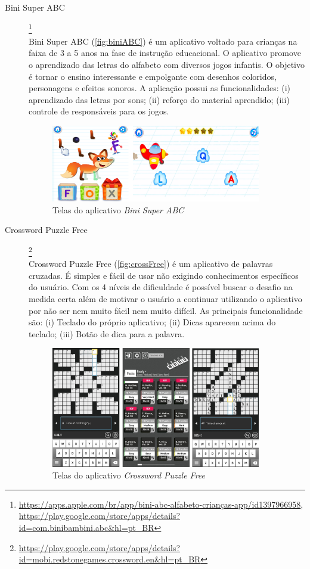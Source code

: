 \begin{description}
\item[Bini Super ABC]\footnote{\url{https://apps.apple.com/br/app/bini-abc-alfabeto-crianças-app/id1397966958}, \url{https://play.google.com/store/apps/details?id=com.binibambini.abc&hl=pt_BR}} \hfill \\
Bini Super ABC (\autoref{fig:biniABC}) é um aplicativo voltado para crianças na faixa de 3 a 5 anos na fase de instrução educacional. O aplicativo promove o aprendizado das letras do alfabeto com diversos jogos infantis. O objetivo é tornar o ensino interessante e empolgante com desenhos coloridos, personagens e efeitos sonoros. A aplicação possui as funcionalidades: (i) aprendizado das letras por sons; (ii) reforço do material aprendido; (iii) controle de responsáveis para os jogos.

\begin{figure}[H]
\centering
    \includegraphics[width=0.9\textwidth]{Figuras/biniabc.png}
    \caption{Telas do aplicativo \textit{Bini Super ABC}}
    \label{fig:biniABC}
\end{figure}

\item[Crossword Puzzle Free]\footnote{\url{https://play.google.com/store/apps/details?id=mobi.redstonegames.crossword.en&hl=pt_BR}} \hfill \\
Crossword Puzzle Free (\autoref{fig:crossFree}) é um aplicativo de palavras cruzadas. É simples e fácil de usar não exigindo conhecimentos específicos do usuário. Com os 4 níveis de dificuldade é possível buscar o desafio na medida certa além de motivar o usuário a continuar utilizando o aplicativo por não ser nem muito fácil nem muito difícil. As principais funcionalidade são: (i) Teclado do próprio aplicativo; (ii) Dicas aparecem acima do teclado; (iii) Botão de dica para a palavra.


\begin{figure}[H]
\centering
    \includegraphics[width=0.9\textwidth]{Figuras/crosswordPuzzleFree.jpg}
    \caption{Telas do aplicativo \textit{Crossword Puzzle Free}}
    \label{fig:crossFree}
\end{figure}


\end{description}

